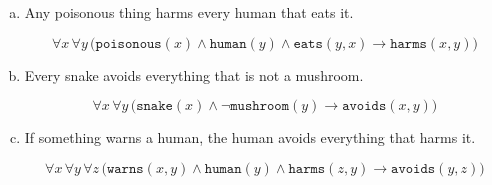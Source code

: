 {\begin{enumerate}[(a)]
  \item \points[2] Any poisonous thing harms every human that eats it.
  \begin{sol}
    \[\forall x\,\forall y\,\bigl(\texttt{poisonous}(x) \wedge \texttt{human}(y) \wedge \texttt{eats}(y, x) \rightarrow \texttt{harms}(x, y)\bigr)\]
  \end{sol}

  \item \points[2] Every snake avoids everything that is not a mushroom.
  \begin{sol}
    \[\forall x\,\forall y\,\bigl(\texttt{snake}(x) \wedge \neg\texttt{mushroom}(y) \rightarrow \texttt{avoids}(x, y)\bigr)\]
  \end{sol}

  \item \points[2] If something warns a human, the human avoids everything that harms it.
  \begin{sol}
    \[\forall x\,\forall y\,\forall z\,\bigl(\texttt{warns}(x, y) \wedge \texttt{human}(y) \wedge \texttt{harms}(z, y) \rightarrow \texttt{avoids}(y, z)\bigr)\]
  \end{sol}
\end{enumerate}
}

\clearpage

